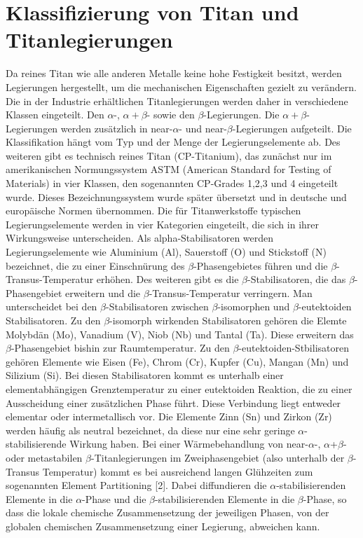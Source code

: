 \section{Klassifizierung von Titan und Titanlegierungen}

Da reines Titan wie alle anderen Metalle keine hohe Festigkeit besitzt, werden Legierungen hergestellt, um die mechanischen Eigenschaften gezielt zu verändern. Die in der Industrie erhältlichen Titanlegierungen werden daher in verschiedene Klassen eingeteilt. Den $\alpha$-, $\alpha+\beta$- sowie den $\beta$-Legierungen. Die $\alpha+\beta$-Legierungen werden zusätzlich in near-$\alpha$- und near-$\beta$-Legierungen aufgeteilt. Die Klassifikation hängt vom Typ und der Menge der Legierungselemente ab. Des weiteren gibt es technisch reines Titan (CP-Titanium), das zunächst nur im amerikanischen Normungssystem ASTM (American Standard for Testing of Materials) in vier Klassen, den sogenannten CP-Grades 1,2,3 und 4 eingeteilt wurde. Dieses Bezeichnungssystem wurde später übersetzt und in deutsche und europäische Normen übernommen.
Die für Titanwerkstoffe typischen Legierungselemente werden in vier Kategorien eingeteilt, die sich in ihrer Wirkungsweise unterscheiden. 
Als alpha-Stabilisatoren werden Legierungselemente wie Aluminium (Al), Sauerstoff (O) und Stickstoff (N) bezeichnet, die zu einer Einschnürung des $\beta$-Phasengebietes führen und die $\beta$-Transus-Temperatur erhöhen.
Des weiteren gibt es die $\beta$-Stabilisatoren, die das $\beta$-Phasengebiet erweitern und die $\beta$-Transus-Temperatur verringern. Man unterscheidet bei den $\beta$-Stabilisatoren zwischen $\beta$-isomorphen und $\beta$-eutektoiden Stabilisatoren. Zu den $\beta$-isomorph wirkenden Stabilisatoren gehören die Elemte Molybdän (Mo), Vanadium (V), Niob (Nb) und Tantal (Ta). Diese erweitern das $\beta$-Phasengebiet bishin zur Raumtemperatur. 
Zu den $\beta$-eutektoiden-Stbilisatoren gehören Elemente wie Eisen (Fe), Chrom (Cr), Kupfer (Cu), Mangan (Mn) und Silizium (Si). Bei diesen Stabilisatoren kommt es unterhalb einer elementabhängigen Grenztemperatur zu einer eutektoiden Reaktion, die zu einer Ausscheidung einer zusätzlichen Phase führt. Diese Verbindung liegt entweder elementar oder intermetallisch vor.
Die Elemente  Zinn (Sn) und Zirkon (Zr) werden häufig als neutral bezeichnet, da diese nur eine sehr geringe $\alpha$-stabilisierende Wirkung haben.
Bei einer Wärmebehandlung von near-$\alpha$-, $\alpha$+$\beta$- oder metastabilen $\beta$-Titanlegierungen im Zweiphasengebiet (also unterhalb der $\beta$-Transus Temperatur) kommt es bei ausreichend langen Glühzeiten zum sogenannten Element Partitioning [2]. Dabei diffundieren die $\alpha$-stabilisierenden Elemente in die $\alpha$-Phase und die $\beta$-stabilisierenden Elemente in die $\beta$-Phase, so dass die lokale chemische Zusammensetzung der jeweiligen Phasen, von der globalen chemischen Zusammensetzung einer Legierung, abweichen kann.


